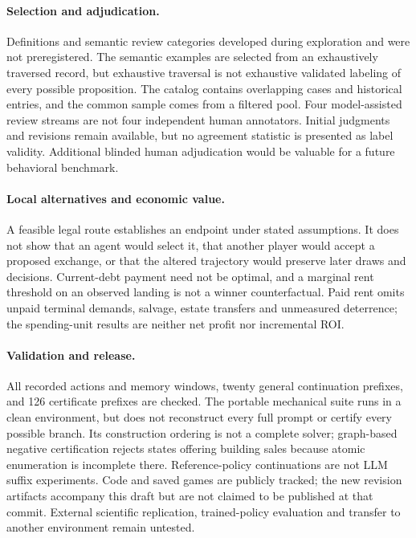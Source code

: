 \paragraph{Selection and adjudication.}
Definitions and semantic review categories developed during exploration and were not preregistered. The semantic examples are selected from an exhaustively traversed record, but exhaustive traversal is not exhaustive validated labeling of every possible proposition. The catalog contains overlapping cases and historical entries, and the common sample comes from a filtered pool. Four model-assisted review streams are not four independent human annotators. Initial judgments and revisions remain available, but no agreement statistic is presented as label validity. Additional blinded human adjudication would be valuable for a future behavioral benchmark.

\paragraph{Local alternatives and economic value.}
A feasible legal route establishes an endpoint under stated assumptions. It does not show that an agent would select it, that another player would accept a proposed exchange, or that the altered trajectory would preserve later draws and decisions. Current-debt payment need not be optimal, and a marginal rent threshold on an observed landing is not a winner counterfactual. Paid rent omits unpaid terminal demands, salvage, estate transfers and unmeasured deterrence; the spending-unit results are neither net profit nor incremental ROI.

\paragraph{Validation and release.}
All recorded actions and memory windows, twenty general continuation prefixes, and 126 certificate prefixes are checked. The portable mechanical suite runs in a clean environment, but does not reconstruct every full prompt or certify every possible branch. Its construction ordering is not a complete solver; graph-based negative certification rejects states offering building sales because atomic enumeration is incomplete there. Reference-policy continuations are not LLM suffix experiments. Code and saved games are publicly tracked; the new revision artifacts accompany this draft but are not claimed to be published at that commit. External scientific replication, trained-policy evaluation and transfer to another environment remain untested.

